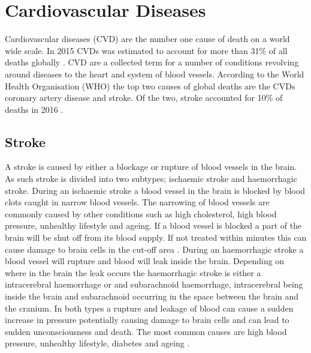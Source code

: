 
\section{Cardiovascular Diseases}

Cardiovascular diseases (CVD) are the number one cause of death on a world wide scale. In 2015 CVDs was estimated to account for more than 31\% of all deaths globally \cite{whocvd2017}. CVD are a collected term for a number of conditions revolving around diseases to the heart and system of blood vessels. According to the World Health Organisation (WHO) the top two causes of global deaths are the CVDs coronary artery disease and stroke. Of the two, stroke accounted for 10\% of deaths in 2016 \cite{whoMortalityStats2018}.

\subsection{Stroke}
A stroke is caused by either a blockage or rupture of blood vessels in the brain. As such stroke is divided into two subtypes; ischaemic stroke and haemorrhagic stroke. During an ischaemic stroke a blood vessel in the brain is blocked by blood clots caught in narrow blood vessels. The narrowing of blood vessels are commonly caused by other conditions such as high cholesterol, high blood pressure, unhealthy lifestyle and ageing. If a blood vessel is blocked a part of the brain will be shut off from its blood supply. If not treated within minutes this can cause damage to brain cells in the cut-off area \cite{Mackay2002, Hering2016chap7, InternetStroke2018}.
During an haemorrhagic stroke a blood vessel will rupture and blood will leak inside the brain. Depending on where in the brain the leak occurs the haemorrhagic stroke is either a intracerebral haemorrhage or and subarachnoid haemorrhage, intracerebral being inside the brain and subarachnoid occurring in the space between the brain and the cranium. In both types a rupture and leakage of blood can cause a sudden increase in pressure potentially causing damage to brain cells and can lead to sudden unconsciousness and death. The most common causes are high blood pressure, unhealthy lifestyle, diabetes and ageing \cite{Mackay2002, Hering2016chap8, InternetStroke2018}.

